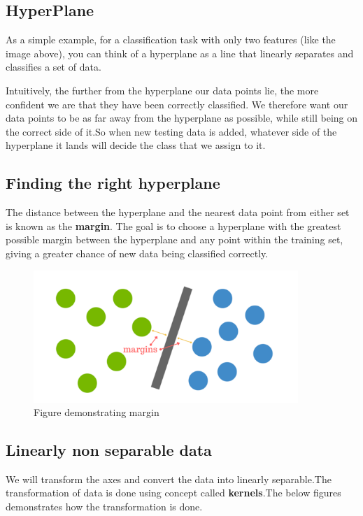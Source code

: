 \subsection{HyperPlane}

As a simple example, for a classification task with only two features (like the image above), you can think of a hyperplane as a line that linearly separates and classifies a set of data.

Intuitively, the further from the hyperplane our data points lie, the more confident we are that they have been correctly classified. We therefore want our data points to be as far away from the hyperplane as possible, while still being on the correct side of it.So when new testing data is added, whatever side of the hyperplane it lands will decide the class that we assign to it.


\subsection{Finding the right hyperplane}

The distance between the hyperplane and the nearest data point from either set is known as the \textbf{margin}. The goal is to choose a hyperplane with the greatest possible margin between the hyperplane and any point within the training set, giving a greater chance of new data being classified correctly.

\begin{figure} [!htbp]
\centering
\includegraphics[width=100mm]{Pictures/svm2.png}
\caption{Figure demonstrating margin}
\end{figure}

\subsection{Linearly non separable data}

We will transform the axes and convert the data into linearly separable.The transformation of data is done using concept called \textbf{kernels}.The below figures demonstrates how the transformation is done.

